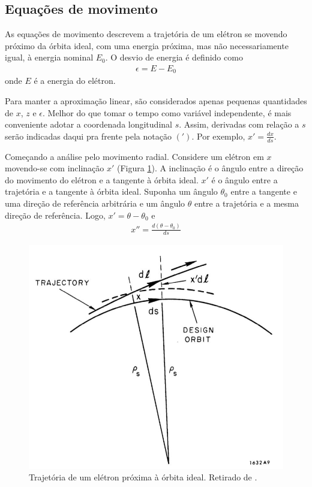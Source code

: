 \subsection{Equações de movimento}\label{sec:2.3}
As equações de movimento descrevem a trajetória de um elétron se movendo próximo da órbita ideal, com uma energia próxima, mas não necessariamente igual, à energia nominal $E_0$. O desvio de energia é definido como
\begin{align}
	\epsilon = E-E_0
\end{align}
onde $E$ é a energia do elétron.

Para manter a aproximação linear, são considerados apenas pequenas quantidades de $x$, $z$ e $\epsilon$. Melhor do que tomar o tempo como variável independente, é mais conveniente adotar a coordenada longitudinal $s$. Assim, derivadas com relação a $s$ serão indicadas daqui pra frente pela notação $(')$. Por exemplo, $x'=\frac{dx}{ds}$.

Começando a análise pelo movimento radial. Considere um elétron em $x$ movendo-se com inclinação $x'$ (Figura \ref{fig:fig9}). A inclinação é o ângulo entre a direção do movimento do elétron e a tangente à órbita ideal. $x'$ é o ângulo entre a trajetória e a tangente à órbita ideal. Suponha um ângulo $\theta_0$ entre a tangente e uma direção de referência arbitrária e um ângulo $\theta$ entre a trajetória e a mesma direção de referência. Logo, $x' = \theta-\theta_0$ e
\begin{align}
	x'' = \frac{d(\theta-\theta_0)}{ds}\label{eq:2.12}
\end{align}

\begin{figure}[!htb]
	\centering
	\includegraphics[width=0.6\linewidth]{./Figuras/fig9.jpeg}
	\caption{Trajetória de um elétron próxima à órbita ideal. Retirado de \cite{sands1970physics}.}
	\label{fig:fig9}
\end{figure}

